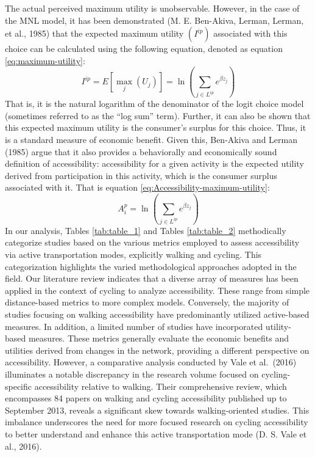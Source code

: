 \documentclass[12pt,twoside]{reedthesis}
\begin{document}
The actual perceived maximum utility is unobservable. However, in the case of the MNL model, it has been demonstrated (M. E. Ben-Akiva, Lerman, Lerman, et al., 1985) that the expected maximum utility \((I^{ip})\) associated with this choice can be calculated using the following equation, denoted as equation \eqref{eq:maximum-utility}:
\begin{equation}
I^{ip} = E\left[ \max_j (U_j) \right] = \ln\left(\sum_{j \in L^{ip}} e^{\beta z_j} \right)
\label{eq:maximum-utility}
\end{equation}
That is, it is the natural logarithm of the denominator of the logit choice model (sometimes referred to as the ``log sum'' term). Further, it can also be shown that this expected maximum utility is the consumer's surplus for this choice. Thus, it is a standard measure of economic benefit. Given this, Ben-Akiva and Lerman (1985) argue that it also provides a behaviorally and economically sound definition of accessibility: accessibility for a given activity is the expected utility derived from participation in this activity, which is the consumer surplus associated with it. That is equation \eqref{eq:Accessibility-maximum-utility}:
\begin{equation}
A^{p}_i = \ln \left(\sum_{j \in L^{ip}} e^{\beta z_j} \right)
\label{eq:Accessibility-maximum-utility}
\end{equation}
In our analysis, Tables \ref{tab:table_1} and Tables \ref{tab:table_2} methodically categorize studies based on the various metrics employed to assess accessibility via active transportation modes, explicitly walking and cycling. This categorization highlights the varied methodological approaches adopted in the field. Our literature review indicates that a diverse array of measures has been applied in the context of cycling to analyze accessibility. These range from simple distance-based metrics to more complex models. Conversely, the majority of studies focusing on walking accessibility have predominantly utilized active-based measures. In addition, a limited number of studies have incorporated utility-based measures. These metrics generally evaluate the economic benefits and utilities derived from changes in the network, providing a different perspective on accessibility. However, a comparative analysis conducted by Vale et al.~(2016) illuminates a notable discrepancy in the research volume focused on cycling-specific accessibility relative to walking. Their comprehensive review, which encompasses 84 papers on walking and cycling accessibility published up to September 2013, reveals a significant skew towards walking-oriented studies. This imbalance underscores the need for more focused research on cycling accessibility to better understand and enhance this active transportation mode (D. S. Vale et al., 2016).
\end{document}
